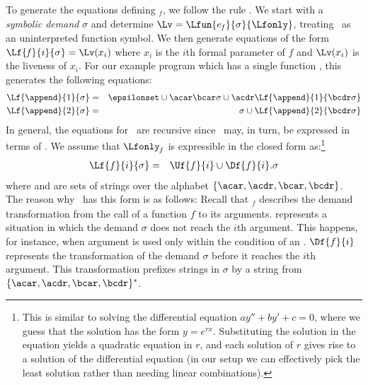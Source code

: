 \documentclass{llncs}
\begin{document}
To generate the equations defining \Lfonly$_{\mathit  f}$, we follow the rule  .   We start with a {\em symbolic demand}
$\sigma$  and determine $\Lv = \Lfun{e_{\mathit{f}}}  {\sigma}
{\Lfonly}$, treating \Lfonly\  as an uninterpreted function symbol.  We  then generate  equations of  the form
$\Lf{\mathit{f}}{i}{\sigma} = \Lv(x_i)$  where $x_i$ is the $i$th
formal parameter  of $\mathit{f}$ and $\Lv(x_i)$  is the liveness
of $x_i$.  For our example program which has  a
single function \append, this generates the following equations:
  \begin{eqnarray*}
    \Lf{\append}{1}{\sigma}
    &=& \epsilonset \cup \acar\bcar\sigma
    \cup \acdr\Lf{\append}{1}{\bcdr\sigma}\\ 
    \Lf{\append}{2}{\sigma}
    &=& \sigma \cup \Lf{\append}{2}{\bcdr\sigma} 
  \end{eqnarray*}
  In  general, the  equations  for \Lfonly\  are recursive  since
  \Lv\ may, in turn, be expressed in terms of \Lfonly.  We assume
  that $\Lfonly_{\mathit f}$ is expressible in the closed form as:\footnote{This
    is  similar to  solving the  differential equation  
    $\mathit{ay}''+\mathit{by}'+\mathit{c}  = 0$, where  we guess
    that    the    solution     has    the    form    $\mathit{y}
    =\mathit{e}^{\mathit{rx}}$.  Substituting the solution in the
    equation  yields  a  quadratic  equation  in  $r$,  and  each
    solution of $r$ gives rise  to a solution of the differential
    equation  (in our  setup we  can effectively  pick  the least
    solution rather than needing linear combinations).  }
\begin{eqnarray}
\label{eq:LF:DI}
  \Lf{f}{i}{\sigma} &=& \Uf{f}{i} \cup \Df{f}{i}.\sigma
\end{eqnarray}
where    and   are  sets  of  strings over  the
alphabet $\lbrace \acar, \acdr,\bcar, \bcdr \rbrace$.  The reason
why \Lfonly\ has this form  is as follows: Recall that
\Lfonly$_{\mathit  f}$ describes  the demand  transformation from
the call of a function ${\mathit f}$ to its arguments.  represents a
situation in which  the demand $\sigma$ does not  reach the $i$th
argument.   This happens,  for  instance, when  argument is  used
only within  the condition  of  an \SIF.   $\Df{f}{i}$ represents  the
transformation of the demand $\sigma$ before it reaches the $i$th
argument. This  transformation prefixes strings in 
$\sigma$ by a string from $\{\acar,\acdr,\bcar,\bcdr\}^*$.
\end{document}
